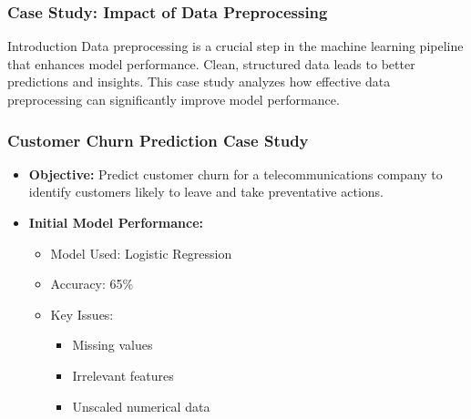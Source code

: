 \documentclass[aspectratio=169]{beamer}
\begin{document}
\begin{frame}
    \frametitle{Case Study: Impact of Data Preprocessing}
    \begin{block}{Introduction}
        Data preprocessing is a crucial step in the machine learning pipeline that enhances model performance. Clean, structured data leads to better predictions and insights. This case study analyzes how effective data preprocessing can significantly improve model performance.
    \end{block}
\end{frame}

\begin{frame}
    \frametitle{Customer Churn Prediction Case Study}
    \begin{itemize}
        \item \textbf{Objective:} Predict customer churn for a telecommunications company to identify customers likely to leave and take preventative actions.
        \item \textbf{Initial Model Performance:}
        \begin{itemize}
            \item Model Used: Logistic Regression
            \item Accuracy: 65\%
            \item Key Issues:
            \begin{itemize}
                \item Missing values
                \item Irrelevant features
                \item Unscaled numerical data
            \end{itemize}
        \end{itemize}
    \end{itemize}
\end{frame}
\end{document}
